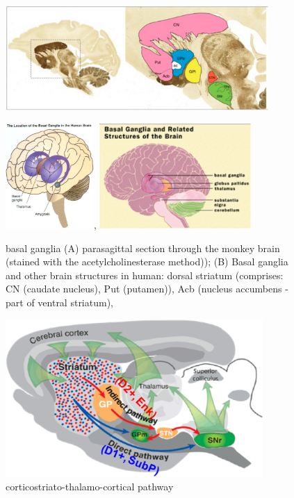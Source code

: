 \begin{figure}[hbt]
  \centerline{ \includegraphics[height=4cm,
    angle=0]{./images/basal-ganglia-monkey.eps}}
  \centerline{ 
    \includegraphics[height=4cm,
    angle=0]{./images/basal-ganglia.eps},
  \includegraphics[height=4cm,
    angle=0]{./images/basal_ganglia.eps}}
\caption{basal ganglia (A) parasagittal section through the monkey brain
(stained with the acetylcholinesterase method)); (B) Basal ganglia and other
brain structures in human: dorsal striatum (comprises: CN (caudate nucleus), Put
(putamen)), Acb (nucleus accumbens - part of ventral striatum),  }
\label{fig:basal_ganglia}
\end{figure}


  
\begin{figure}[hbt]
  \centerline{\includegraphics[height=6cm,
    angle=0]{./images/corticostriato-thalamo-cortical-pathway.eps}}
\caption{corticostriato-thalamo-cortical pathway}
\label{fig:corticostriato-thalamo-cortical-pathway}
\end{figure}




